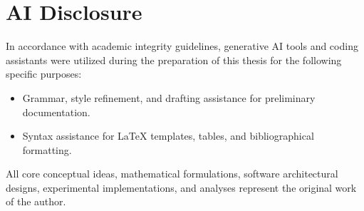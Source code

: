 \chapter*{AI Disclosure}

\noindent
In accordance with academic integrity guidelines, generative AI tools and coding assistants were utilized during the preparation of this thesis for the following specific purposes:
\begin{itemize}
    \item Grammar, style refinement, and drafting assistance for preliminary documentation.
    \item Syntax assistance for LaTeX templates, tables, and bibliographical formatting.
\end{itemize}
All core conceptual ideas, mathematical formulations, software architectural designs, experimental implementations, and analyses represent the original work of the author.
